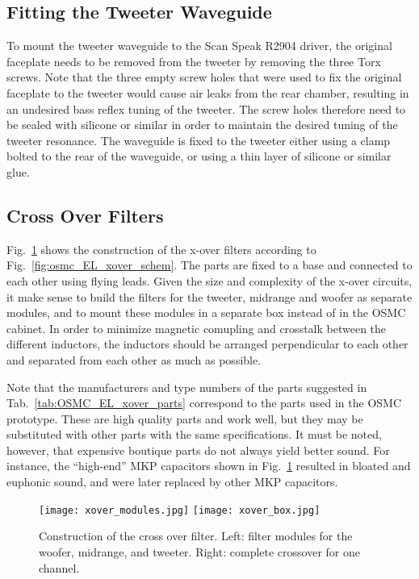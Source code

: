 \documentclass[12pt,a4paper]{article}
\providecommand{\figr}[1]{Fig.~\ref{fig:#1}}
\providecommand{\figlabel}[1]{\label{fig:#1}}
\providecommand{\tabl}[1]{Tab.~\ref{tab:#1}}
\begin{document}
\subsection{Fitting the Tweeter Waveguide}
To mount the tweeter waveguide to the Scan Speak R2904 driver, the original faceplate needs to be removed from the tweeter by removing the three Torx screws. Note that the three empty screw holes that were used to fix the original faceplate to the tweeter would cause air leaks from the rear chamber, resulting in an undesired bass reflex tuning of the tweeter.\cite{scan_waveguide_bassreflex} The screw holes therefore need to be sealed with silicone or similar in order to maintain the desired tuning of the tweeter resonance.\cite{scan_waveguide_seal} The waveguide is fixed to the tweeter either using a clamp bolted to the rear of the waveguide, or using a thin layer of silicone or similar glue.


\subsection{Cross Over Filters}
\figr{osmc_xover_construction} shows the construction of the x-over filters according to \figr{osmc_EL_xover_schem}. The parts are fixed to a base and connected to each other using flying leads. Given the size and complexity of the x-over circuits, it make sense to build the filters for the tweeter, midrange and woofer as separate modules, and to mount these modules in a separate box instead of in the OSMC cabinet. In order to minimize magnetic comupling and crosstalk between the different inductors, the inductors should be arranged perpendicular to each other and separated from each other as much as possible.\cite{osmc_p833}

Note that the manufacturers and type numbers of the parts suggested in \tabl{OSMC_EL_xover_parts} correspond to the parts used in the OSMC prototype. These are high quality parts and work well, but they may be substituted with other parts with the same specifications. It must be noted, however, that expensive boutique parts do not always yield better sound. For instance, the ``high-end'' MKP capacitors shown in \figr{osmc_xover_construction} resulted in bloated and euphonic sound, and were later replaced by other MKP capacitors.\cite{MKPtypes}

\begin{figure}[tbp]
	\centering
	\texttt{[image: xover\_modules.jpg]}
	\hfill
	\texttt{[image: xover\_box.jpg]}
	\caption{Construction of the cross over filter. Left: filter modules for the woofer, midrange, and tweeter. Right: complete crossover for one channel.}
	\figlabel{osmc_xover_construction}
\end{figure}
\end{document}
